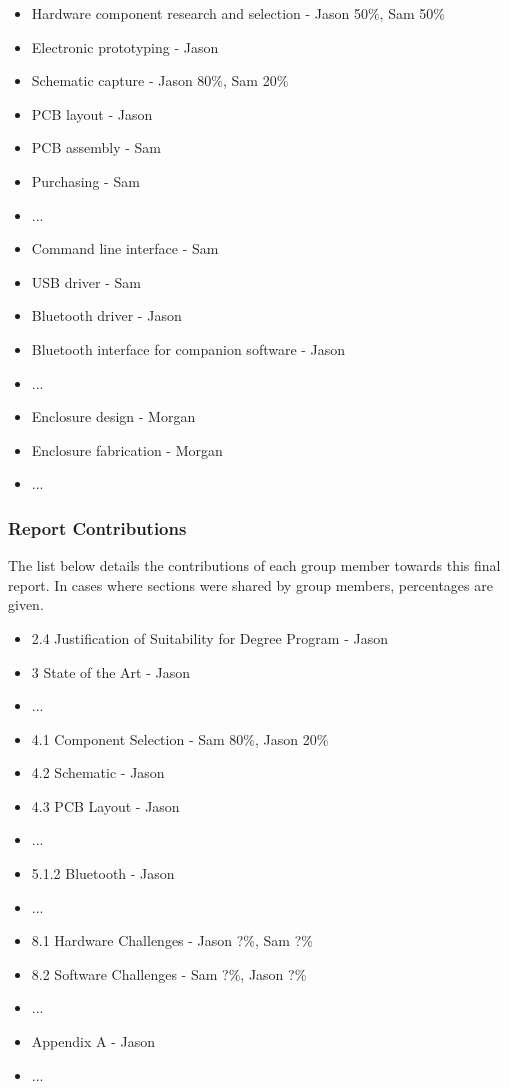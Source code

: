 \begin{itemize}
    \item Hardware component research and selection - Jason 50\%, Sam 50\%
    \item Electronic prototyping - Jason
    \item Schematic capture - Jason 80\%, Sam 20\%
    \item PCB layout - Jason
    \item PCB assembly - Sam
    \item Purchasing - Sam
    \item ...
    \item Command line interface - Sam
    \item USB driver - Sam
    \item Bluetooth driver - Jason
    \item Bluetooth interface for companion software - Jason
    \item ...
    \item Enclosure design - Morgan
    \item Enclosure fabrication - Morgan
    \item ...
\end{itemize}

\subsubsection{Report Contributions}
The list below details the contributions of each group member towards this final
report. In cases where sections were shared by group members, percentages are
given.

\begin{itemize}
    \item 2.4 Justification of Suitability for Degree Program - Jason
    \item 3 State of the Art - Jason
    \item ...
    \item 4.1 Component Selection - Sam 80\%, Jason 20\%
    \item 4.2 Schematic - Jason
    \item 4.3 PCB Layout - Jason
    \item ...
    \item 5.1.2 Bluetooth - Jason
    \item ...
    \item 8.1 Hardware Challenges - Jason ?\%, Sam ?\%
    \item 8.2 Software Challenges - Sam ?\%, Jason ?\%
    \item ...
    \item Appendix A - Jason
    \item ...
\end{itemize}